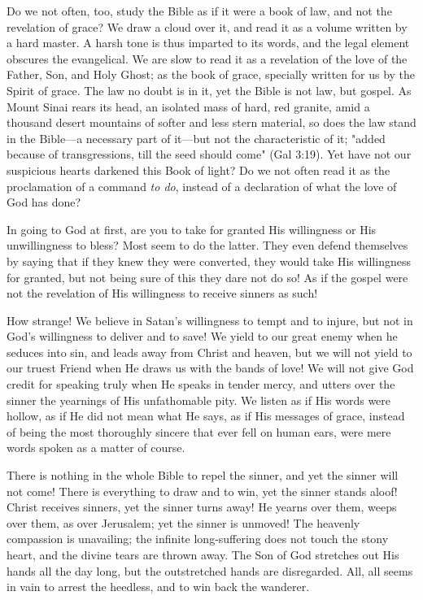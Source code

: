 \documentclass[
]{book}
\begin{document}
Do we not often, too, study the Bible as if it were a book of law, and not the revelation of grace? We draw a cloud over it, and read it as a volume written by a hard master. A harsh tone is thus imparted to its words, and the legal element obscures the evangelical. We are slow to read it as a revelation of the love of the Father, Son, and Holy Ghost; as the book of grace, specially written for us by the Spirit of grace. The law no doubt is in it, yet the Bible is not law, but gospel. As Mount Sinai rears its head, an isolated mass of hard, red granite, amid a thousand desert mountains of softer and less stern material, so does the law stand in the Bible---a necessary part of it---but not the characteristic of it; "added because of transgressions, till the seed should come" (Gal 3:19). Yet have not our suspicious hearts darkened this Book of light? Do we not often read it as the proclamation of a command \emph{to do}, instead of a declaration of what the love of God has done?

In going to God at first, are you to take for granted His willingness or His unwillingness to bless? Most seem to do the latter. They even defend themselves by saying that if they knew they were converted, they would take His willingness for granted, but not being sure of this they dare not do so! As if the gospel were not the revelation of His willingness to receive sinners as such!

How strange! We believe in Satan's willingness to tempt and to injure, but not in God's willingness to deliver and to save! We yield to our great enemy when he seduces into sin, and leads away from Christ and heaven, but we will not yield to our truest Friend when He draws us with the bands of love! We will not give God credit for speaking truly when He speaks in tender mercy, and utters over the sinner the yearnings of His unfathomable pity. We listen as if His words were hollow, as if He did not mean what He says, as if His messages of grace, instead of being the most thoroughly sincere that ever fell on human ears, were mere words spoken as a matter of course.

There is nothing in the whole Bible to repel the sinner, and yet the sinner will not come! There is everything to draw and to win, yet the sinner stands aloof! Christ receives sinners, yet the sinner turns away! He yearns over them, weeps over them, as over Jerusalem; yet the sinner is unmoved! The heavenly compassion is unavailing; the infinite long-suffering does not touch the stony heart, and the divine tears are thrown away. The Son of God stretches out His hands all the day long, but the outstretched hands are disregarded. All, all seems in vain to arrest the heedless, and to win back the wanderer.
\end{document}
